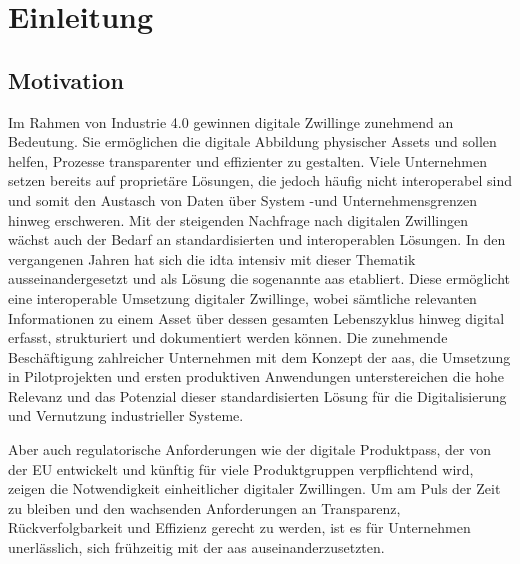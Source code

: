 \section{Einleitung}
\subsection{Motivation}
\label{sec:Motivation}
Im Rahmen von Industrie 4.0 gewinnen digitale Zwillinge zunehmend an Bedeutung. 
Sie ermöglichen die digitale Abbildung physischer Assets und sollen helfen, Prozesse transparenter und effizienter zu gestalten.
Viele Unternehmen setzen bereits auf proprietäre Lösungen, die jedoch häufig nicht interoperabel sind und somit den Austasch von Daten über System -und Unternehmensgrenzen hinweg erschweren.
Mit der steigenden Nachfrage nach digitalen Zwillingen wächst auch der Bedarf an standardisierten und interoperablen Lösungen.
In den vergangenen Jahren hat sich die \ac{idta} intensiv mit dieser Thematik ausseinandergesetzt und als Lösung die sogenannte \ac{aas} etabliert.
Diese ermöglicht eine interoperable Umsetzung digitaler Zwillinge, wobei sämtliche relevanten Informationen zu einem Asset über dessen gesamten Lebenszyklus hinweg digital erfasst, strukturiert und dokumentiert werden können. 
Die zunehmende Beschäftigung zahlreicher Unternehmen mit dem Konzept der \acs{aas}, die Umsetzung in Pilotprojekten und ersten produktiven Anwendungen unterstereichen die hohe Relevanz und das Potenzial dieser standardisierten Lösung für die Digitalisierung und Vernutzung industrieller Systeme.

Aber auch regulatorische Anforderungen wie der digitale Produktpass, der von der EU entwickelt und künftig für viele Produktgruppen verpflichtend wird, zeigen die Notwendigkeit einheitlicher digitaler Zwillingen. 
Um am Puls der Zeit zu bleiben und den wachsenden Anforderungen an Transparenz, Rückverfolgbarkeit und Effizienz gerecht zu werden, ist es für Unternehmen unerlässlich, sich frühzeitig mit der \acs{aas} auseinanderzusetzten.

